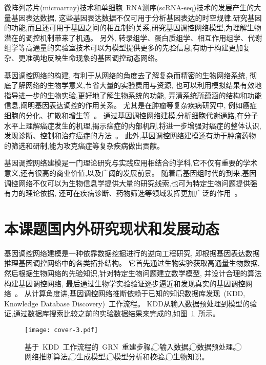 微阵列芯片(microarray)技术和单细胞~RNA测序(scRNA-seq)技术的发展产生的大量基因表达数据,
这些基因表达数据不仅可用于分析基因表达的时空规律,研究基因的功能,而且还可用于基因之间的相互制约关系,研究基因调控网络模型,为理解生物潜在的调控机制带来了机遇。
另外, 转录组学、蛋白质组学、相互作用组学、代谢组学等高通量的实验室技术可以为模型提供更多的先验信息,有助于构建更加复杂、更准确地反映生命现象的基因调控动态网络。


基因调控网络的构建,
有利于从网络的角度去了解复杂而精密的生物网络系统,
彻底了解网络的生物学意义,节省大量的实验费用与资源,
也可以利用模拟结果有效地指导进一步的生物实验,更好地了解生物系统的功能,
弄清系统所蕴涵的结构和功能信息,阐明基因表达调控的作用关系。
尤其是在肿瘤等复杂疾病研究中,
例如癌症细胞的分化、扩散和增生等~\cite{hurley2011gene}。
通过基因调控网络建模,分析细胞代谢通路,在分子水平上理解癌症发生的机理,揭示癌症的内部机制,将进一步增强对癌症的整体认识,
发现诊断、控制和治疗癌症的方法~\cite{kreeger2009cancer,yan2016biological}。
此外,基因调控网络建模还有助于肿瘤药物的筛选和研制,能为攻克癌症等复杂疾病做出贡献。

基因调控网络建模是一门理论研究与实践应用相结合的学科,它不仅有重要的学术意义,还有很高的商业价值,以及广阔的发展前景。
随着后基因组时代的到来,基因调控网络不仅可以为生物信息学提供大量的研究线索,也可为特定生物问题提供强有力的理论依据,
还可在疾病诊断、药物筛选等领域发挥更加广泛的作用~\cite{kreeger2009cancer}。

\section{本课题国内外研究现状和发展动态}

基因调控网络建模是一种依靠数据挖掘进行的逆向工程研究, 即根据基因表达数据推理基因调控网络中的各类拓扑结构。
它首先通过生物实验获取高通量生物数据, 然后根据生物网络的先验知识,针对特定生物问题建立数学模型, 并设计合理的算法构建基因调控网络,
最后通过生物学实验验证逐步逼近和发现真实的基因调控网络~\cite{sima2009inference}。
从计算角度讲,基因调控网络推断依赖于已知的知识数据库发现~(KDD, Knowledge Database Discovery)~工作流程。
KDD从输入数据预处理到模型的验证,通过数据库搜索比较之前的实验数据结果来完成的,如图~\ref{cover-3}~所示。
\begin{figure}[!htbp]
    \centering
    \texttt{[image: cover-3.pdf]}
    \caption{基于~KDD~工作流程的~GRN~重建步骤。
    \textcircled{\raisebox{-0.9pt}{1}}输入数据。
    \textcircled{\raisebox{-0.9pt}{2}}数据预处理。
    \textcircled{\raisebox{-0.9pt}{3}}网络推断算法。
    \textcircled{\raisebox{-0.9pt}{4}}生成模型。
    \textcircled{\raisebox{-0.9pt}{5}}模型分析和校验。
    \textcircled{\raisebox{-0.9pt}{6}}生物知识。
    }
    \label{cover-3}
\end{figure}

